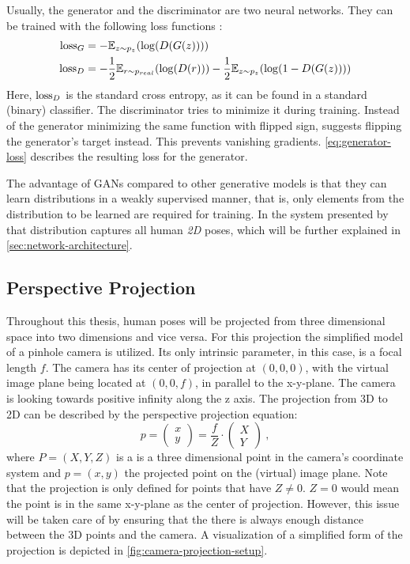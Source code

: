 Usually, the generator and the discriminator are two neural networks.
They can be trained with the following loss functions \cite{goodfellow17}:
\begin{align}
\label{eq:generator-loss}
\operatorname{loss}_G &= -\mathbb{E}_{z\sim p_{z}}(\log(D(G(z)))) \\
\label{eq:discriminator-loss}
\operatorname{loss}_D &= -\frac{1}{2}\mathbb{E}_{r\sim p_{real}}(\log(D(r))) - \frac{1}{2} \mathbb{E}_{z\sim p_{z}}(\log(1 - D(G(z))))
\end{align}
Here, $\operatorname{loss}_D$ is the standard cross entropy, as it can be found in a standard (binary) classifier.
The discriminator tries to minimize it during training.
Instead of the generator minimizing the same function with flipped sign, \citet{goodfellow17} suggests flipping the generator's target instead.
This prevents vanishing gradients.
\autoref{eq:generator-loss} describes the resulting loss for the generator.

The advantage of GANs compared to other generative models is that they can learn distributions in a weakly supervised manner, that is, only elements from the distribution to be learned are required for training.
In the system presented by \citet{drover18} that distribution captures all human \emph{2D} poses, which will be further explained in \autoref{sec:network-architecture}.

\subsection{Perspective Projection}



Throughout this thesis, human poses will be projected from three dimensional space into two dimensions and vice versa.
For this projection the simplified model of a pinhole camera is utilized. 
Its only intrinsic parameter, in this case, is a focal length $f$.
The camera has its center of projection at $(0, 0, 0)$, with the virtual image plane being located at $(0, 0, f)$, in parallel to the x-y-plane.
The camera is looking towards positive infinity along the z axis.
The projection from 3D to 2D can be described by the perspective projection equation:
\begin{equation}
	\label{eq:perspective-projection}
	p = 
	\begin{pmatrix}
	x\\
	y
	\end{pmatrix}
	= \frac{f}{Z} \cdot 	
	\begin{pmatrix}
	X\\
	Y
	\end{pmatrix} \ ,
\end{equation}
where $P = (X, Y, Z)$ is a is a three dimensional point in the camera's coordinate system and $p = (x, y)$ the projected point on the (virtual) image plane.
Note that the projection is only defined for points that have $Z \neq 0$.
$Z = 0$ would mean the point is in the same x-y-plane as the center of projection.
However, this issue will be taken care of by ensuring that the there is always enough distance between the 3D points and the camera.
A visualization of a simplified form of the projection is depicted in \autoref{fig:camera-projection-setup}.

